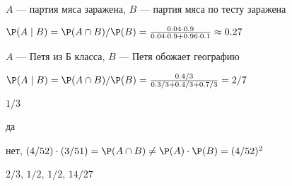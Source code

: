 \begin{solution}{3.7}
  $A$ — партия мяса заражена, $B$ — партия мяса по тесту заражена

  $\P(A \mid B)=\P(A \cap B)/\P(B)=\frac{0.04\cdot 0.9}{0.04\cdot 0.9+0.96\cdot 0.1}\approx 0.27$
\end{solution}
\begin{solution}{3.8}
  $A$ — Петя из Б класса, $B$ — Петя обожает географию

  $\P(A \mid B)=\P(A \cap B)/\P(B)=\frac{0.4/3}{0.3/3+0.4/3+0.7/3}=2/7$
\end{solution}
\begin{solution}{3.9}
  $1/3$
\end{solution}
\begin{solution}{3.10}
  да
\end{solution}
\begin{solution}{3.11}
  нет, $(4/52)\cdot (3/51)=\P(A\cap B) \neq \P(A)\cdot \P(B)=(4/52)^2$
\end{solution}
\begin{solution}{3.12}
\end{solution}
\begin{solution}{3.13}
$ 2/3 $, $1/2$, $ 1/2 $, $ 14/27 $
\end{solution}
\begin{solution}{4.1}
\end{solution}
\begin{solution}{4.2}
\end{solution}
\begin{solution}{4.3}
\end{solution}
\begin{solution}{4.4}
\end{solution}
\begin{solution}{4.5}
\end{solution}
\begin{solution}{5.1}
\end{solution}
\begin{solution}{5.2}
\end{solution}
\begin{solution}{5.3}
\end{solution}
\begin{solution}{5.4}
\end{solution}
\begin{solution}{5.5}
\end{solution}
\begin{solution}{5.6}
\end{solution}
